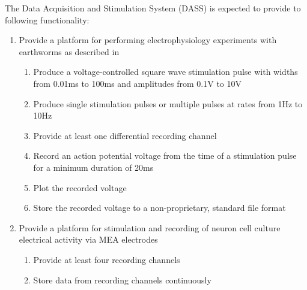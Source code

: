 

The Data Acquisition and Stimulation System (DASS) is expected to provide to following functionality:

\begin{enumerate}

\item Provide a platform for performing electrophysiology experiments with earthworms as described in~\cite{Olivo,KuehJellies}

	\begin{enumerate}
	
	\item Produce a voltage-controlled square wave stimulation pulse with widths from 0.01ms to 100ms and amplitudes from 0.1V to 10V
	
	\item Produce single stimulation pulses or multiple pulses at rates from 1Hz to 10Hz
	
	\item Provide at least one differential recording channel
	
	\item Record an action potential voltage from the time of a stimulation pulse for a minimum duration of 20ms
	
	\item Plot the recorded voltage
	
	\item Store the recorded voltage to a non-proprietary, standard file format
	
	\end{enumerate}
	

\item Provide a platform for stimulation and recording of neuron cell culture electrical activity via MEA electrodes

	\begin{enumerate}
	
	\item Provide at least four recording channels
	
	\item Store data from recording channels continuously
	

\end{enumerate}
\end{enumerate}
